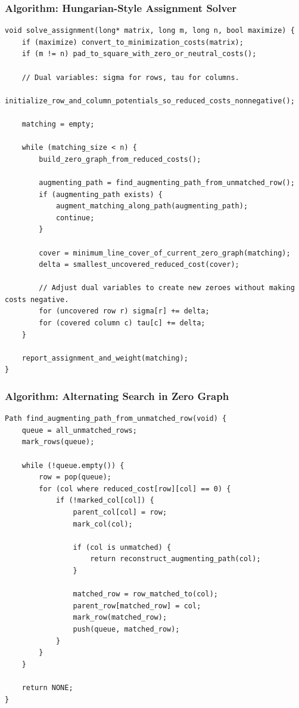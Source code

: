 \documentclass[11pt]{article}
\begin{document}
\subsubsection{Algorithm: Hungarian-Style Assignment Solver}\label{algorithm-hungarian-style-assignment-solver}

\begin{verbatim}
void solve_assignment(long* matrix, long m, long n, bool maximize) {
    if (maximize) convert_to_minimization_costs(matrix);
    if (m != n) pad_to_square_with_zero_or_neutral_costs();

    // Dual variables: sigma for rows, tau for columns.
    initialize_row_and_column_potentials_so_reduced_costs_nonnegative();

    matching = empty;

    while (matching_size < n) {
        build_zero_graph_from_reduced_costs();

        augmenting_path = find_augmenting_path_from_unmatched_row();
        if (augmenting_path exists) {
            augment_matching_along_path(augmenting_path);
            continue;
        }

        cover = minimum_line_cover_of_current_zero_graph(matching);
        delta = smallest_uncovered_reduced_cost(cover);

        // Adjust dual variables to create new zeroes without making costs negative.
        for (uncovered row r) sigma[r] += delta;
        for (covered column c) tau[c] += delta;
    }

    report_assignment_and_weight(matching);
}
\end{verbatim}

\subsubsection{Algorithm: Alternating Search in Zero Graph}\label{algorithm-alternating-search-in-zero-graph}

\begin{verbatim}
Path find_augmenting_path_from_unmatched_row(void) {
    queue = all_unmatched_rows;
    mark_rows(queue);

    while (!queue.empty()) {
        row = pop(queue);
        for (col where reduced_cost[row][col] == 0) {
            if (!marked_col[col]) {
                parent_col[col] = row;
                mark_col(col);

                if (col is unmatched) {
                    return reconstruct_augmenting_path(col);
                }

                matched_row = row_matched_to(col);
                parent_row[matched_row] = col;
                mark_row(matched_row);
                push(queue, matched_row);
            }
        }
    }

    return NONE;
}
\end{verbatim}
\end{document}
